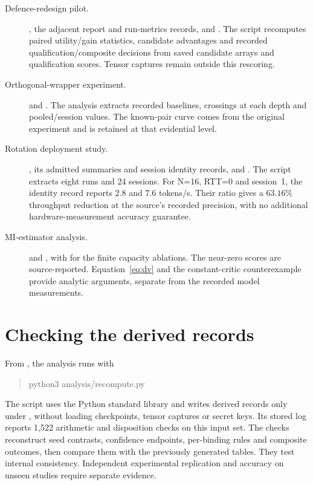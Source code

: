 \begin{description}
\item[\hypertarget{artifact-P4}{Defence-redesign pilot.}]
,
the adjacent report and run-metrics records, and
.
The script recomputes paired utility/gain statistics, candidate advantages
and recorded qualification/composite decisions from saved candidate arrays
and qualification scores. Tensor captures remain outside this rescoring.

\item[\hypertarget{artifact-E8}{Orthogonal-wrapper experiment.}]
and .
The analysis extracts recorded baselines, crossings at each depth and
pooled/session values. The known-pair curve comes from the original
experiment and is retained at that evidential level.

\item[\hypertarget{artifact-ER}{Rotation deployment study.}]
,
its admitted summaries and session identity records, and
.
The script extracts eight runs and 24 sessions. For N=16, RTT=0 and
session~1, the identity record reports $2.8$ and $7.6$ tokens/s. Their
ratio gives a $63.16\%$ throughput reduction at the source's recorded
precision, with no additional hardware-measurement accuracy guarantee.

\item[\hypertarget{artifact-MI}{MI-estimator analysis.}]
 and
, with
 for the
finite capacity ablations. The near-zero scores are source-reported.
Equation~\eqref{eq:dv} and the constant-critic counterexample provide
analytic arguments, separate from the recorded model measurements.
\end{description}

\section{Checking the derived records}
\label{app:checks}

From , the analysis runs with
\begin{quote}\small\ttfamily
python3 analysis/recompute.py
\end{quote}
The script uses the Python standard library and writes derived records only
under , without loading checkpoints, tensor
captures or secret keys. Its stored log reports 1,522 arithmetic and
disposition checks on this input set. The checks reconstruct seed
contrasts, confidence endpoints, per-binding rules and composite outcomes,
then compare them with the previously generated tables. They test internal
consistency. Independent experimental replication and accuracy on unseen
studies require separate evidence.

